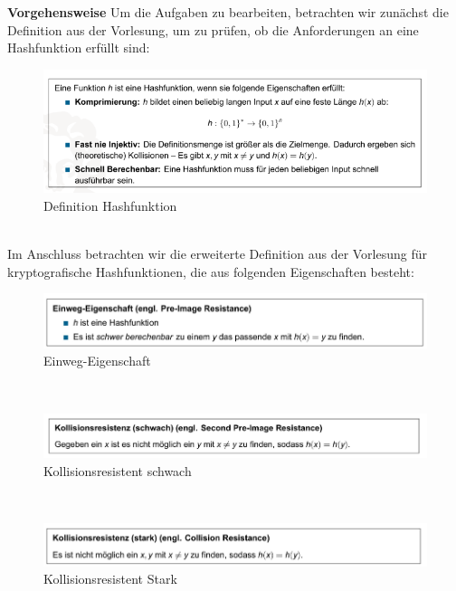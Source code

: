 \documentclass[german]{../uebung}
\begin{document}
\begin{exercise}{1}
	\textbf{Vorgehensweise}
	Um die Aufgaben zu bearbeiten, betrachten wir zunächst die Definition aus der Vorlesung, um zu prüfen, ob die Anforderungen an eine Hashfunktion erfüllt sind:\\
	\begin{figure}[h]
		\centering
		\includegraphics*[scale=.5]{Definition Hashfunktion.png}
		\caption{Definition Hashfunktion}
	\end{figure}\\
	Im Anschluss betrachten wir die erweiterte Definition aus der Vorlesung für kryptografische Hashfunktionen, die aus folgenden Eigenschaften besteht:\\
	\begin{figure}[h]
		\centering
		\includegraphics*[scale=.5]{EinwegEigenschaft.png}
		\caption{Einweg-Eigenschaft}
	\end{figure}\\
	\begin{figure}[h]
		\centering
		\includegraphics*[scale=.5]{Kollisionsresistent.png}
		\caption{Kollisionsresistent schwach}
	\end{figure}\\
	\begin{figure}[h]
		\centering
		\includegraphics*[scale=.5]{KollisionsresistentStark.png}
		\caption{Kollisionsresistent Stark}
	\end{figure}\\

\end{exercise}
\end{document}
